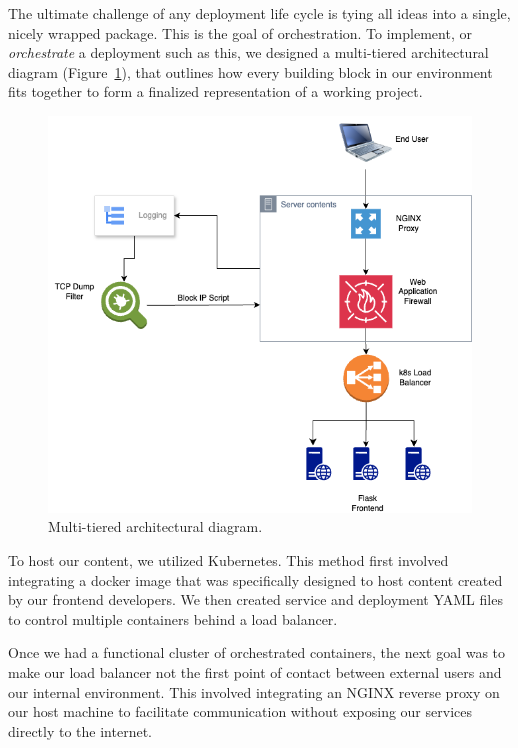 The ultimate challenge of any deployment life cycle is tying all ideas into a single, nicely wrapped package. This is the goal of orchestration.
To implement, or \textit{orchestrate} a deployment such as this, we designed a multi-tiered architectural diagram (Figure~\ref{fig:architecture}), 
that outlines how every building block in our environment fits together to form a finalized representation of a working project. 

\begin{figure}[h]
    \centering
    \includegraphics[width=\columnwidth]{resources/diagram.png} 
    \caption{Multi-tiered architectural diagram.}
    \label{fig:architecture}
\end{figure}

To host our content, we utilized Kubernetes. This method first involved integrating a docker image that was specifically designed to host content created by our frontend developers.
We then created service and deployment YAML files to control multiple containers behind a load balancer. 

Once we had a functional cluster of orchestrated containers, the next goal was to make our load balancer not the first point of contact between external users and our internal environment. 
This involved integrating an NGINX reverse proxy on our host machine to facilitate communication without exposing our services directly to the internet. 

